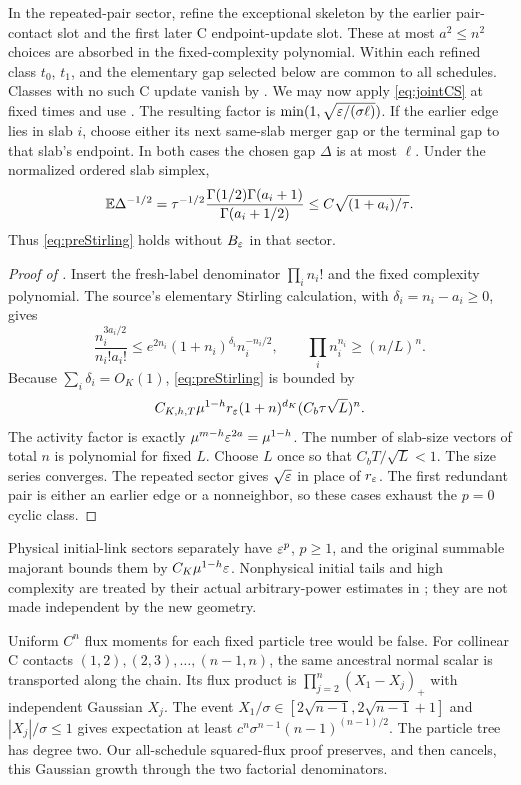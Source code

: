 In the repeated-pair sector, refine the exceptional skeleton by the
earlier pair-contact slot and the first later C endpoint-update slot.
These at most $a^2\leq n^2$ choices are absorbed in the fixed-complexity
polynomial. Within each refined class $t_0$, $t_1$, and the elementary
gap selected below are common to all schedules. Classes with no such
C update vanish by .
We may now apply \eqref{eq:jointCS} at fixed times
and use . The resulting factor is
$\min(1,\sqrt{\varepsilon/(\sigma\ell)})$.
If the earlier edge lies in slab $i$, choose either its next same-slab
merger gap or the terminal gap to that slab's endpoint. In both cases
the chosen gap $\Delta$ is at most $\ell$. Under the normalized ordered
slab simplex,
\[
 \mathbb E\Delta^{-1/2}
 =\tau^{-1/2}
   \frac{\Gamma(1/2)\Gamma(a_i+1)}{\Gamma(a_i+1/2)}
 \leq C\sqrt{(1+a_i)/\tau}.
\]
Thus \eqref{eq:preStirling} holds without $B_\varepsilon$ in that sector.

\begin{proof}[Proof of ]
Insert the fresh-label denominator $\prod_i n_i!$ and the fixed
complexity polynomial. The source's elementary Stirling calculation,
with $\delta_i=n_i-a_i\geq0$, gives
\[
 \frac{n_i^{3a_i/2}}{n_i!a_i!}
 \leq e^{2n_i}(1+n_i)^{\delta_i}n_i^{-n_i/2},
 \qquad
 \prod_i n_i^{n_i}\geq(n/L)^n .
\]
Because $\sum_i\delta_i=O_K(1)$, \eqref{eq:preStirling} is bounded by
\[
 C_{K,h,T}\mu^{1-h}r_\varepsilon
       (1+n)^{d_K}(C_b\tau\sqrt L)^n .
\]
The activity factor is exactly $\mu^{m-h}\varepsilon^{2a}=\mu^{1-h}$.
The number of slab-size vectors of total $n$ is polynomial for fixed $L$.
Choose $L$ once so that $C_bT/\sqrt L<1$. The size series converges.
The repeated sector gives $\sqrt{\varepsilon}$ in place of $r_\varepsilon$.
The first redundant pair is either an earlier edge or a nonneighbor,
so these cases exhaust the $p=0$ cyclic class.
\end{proof}

Physical initial-link sectors separately have $\varepsilon^p$, $p\geq1$,
and the original summable majorant bounds them by
$C_K\mu^{1-h}\varepsilon$. Nonphysical initial tails and high complexity
are treated by their actual arbitrary-power estimates in
; they are not made independent by the new geometry.

\begin{remark}
Uniform $C^n$ flux moments for each fixed particle tree would be false.
For collinear C contacts $(1,2),(2,3),\ldots,(n-1,n)$, the same ancestral
normal scalar is transported along the chain. Its flux product is
$\prod_{j=2}^n(X_1-X_j)_+$ with independent Gaussian $X_j$.
The event $X_1/\sigma\in[2\sqrt{n-1},2\sqrt{n-1}+1]$ and
$|X_j|/\sigma\leq1$ gives expectation at least
$c^n\sigma^{n-1}(n-1)^{(n-1)/2}$.
The particle tree has degree two. Our all-schedule squared-flux proof
preserves, and then cancels, this Gaussian growth through the two
factorial denominators.
\end{remark}
